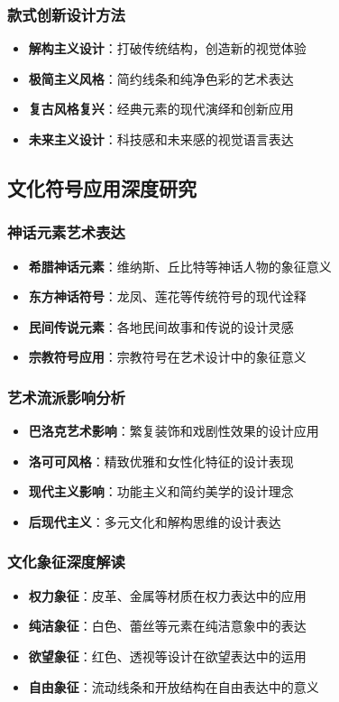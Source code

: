 \documentclass[12pt,UTF8]{ctexbook}
\begin{document}
\subsubsection{款式创新设计方法}
\begin{itemize}[leftmargin=2cm]
	\item \textbf{解构主义设计}：打破传统结构，创造新的视觉体验
	\item \textbf{极简主义风格}：简约线条和纯净色彩的艺术表达
	\item \textbf{复古风格复兴}：经典元素的现代演绎和创新应用
	\item \textbf{未来主义设计}：科技感和未来感的视觉语言表达
\end{itemize}

\subsection{文化符号应用深度研究}
\subsubsection{神话元素艺术表达}
\begin{itemize}[leftmargin=2cm]
	\item \textbf{希腊神话元素}：维纳斯、丘比特等神话人物的象征意义
	\item \textbf{东方神话符号}：龙凤、莲花等传统符号的现代诠释
	\item \textbf{民间传说元素}：各地民间故事和传说的设计灵感
	\item \textbf{宗教符号应用}：宗教符号在艺术设计中的象征意义
\end{itemize}

\subsubsection{艺术流派影响分析}
\begin{itemize}[leftmargin=2cm]
	\item \textbf{巴洛克艺术影响}：繁复装饰和戏剧性效果的设计应用
	\item \textbf{洛可可风格}：精致优雅和女性化特征的设计表现
	\item \textbf{现代主义影响}：功能主义和简约美学的设计理念
	\item \textbf{后现代主义}：多元文化和解构思维的设计表达
\end{itemize}

\subsubsection{文化象征深度解读}
\begin{itemize}[leftmargin=2cm]
	\item \textbf{权力象征}：皮革、金属等材质在权力表达中的应用
	\item \textbf{纯洁象征}：白色、蕾丝等元素在纯洁意象中的表达
	\item \textbf{欲望象征}：红色、透视等设计在欲望表达中的运用
	\item \textbf{自由象征}：流动线条和开放结构在自由表达中的意义
\end{itemize}
\end{document}
